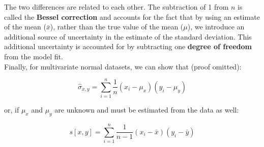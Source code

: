 The two differences are related to each other. The subtraction of 1
from $n$ is called the \textbf{Bessel correction} and accounts for the
fact that by using an estimate of the mean ($\bar{x}$), rather than
the true value of the mean ($\mu$), we introduce an additional source
of uncertainty in the estimate of the standard deviation. This
additional uncertainty is accounted for by subtracting one
\textbf{degree of freedom} from the model fit.\\

Finally, for multivariate normal datasets, we can show that (proof
omitted):

\begin{equation}
  \hat{\sigma}_{x,y} = \sum\limits_{i=1}^{n}\frac{1}{n}(x_i-\mu_x)(y_i-\mu_y)
\end{equation}

\noindent or, if $\mu_x$ and $\mu_y$ are unknown and must be estimated
from the data as well:

\begin{equation}
  s[x,y] = \sum\limits_{i=1}^{n}\frac{1}{n-1}(x_i-\bar{x})(y_i-\bar{y})
  \label{eq:sxy}
\end{equation}
